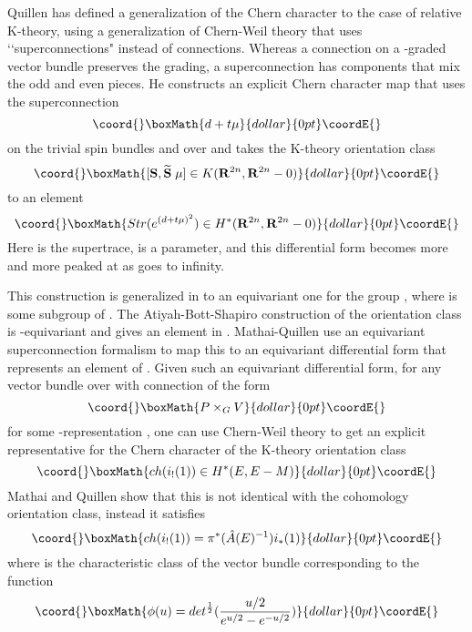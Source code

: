 \documentclass[a4paper,a4paper]{article}
\theoremstyle{conjecture}
\begin{document}
Quillen \cite{Quillen} has defined a generalization of the Chern character to
the case of relative K-theory, using a generalization of Chern-Weil theory that
uses \lq\lq superconnections" instead of connections.  Whereas a connection on
a \coordHE{}-graded vector bundle preserves the grading, a superconnection has
components that mix the odd and even pieces. He constructs an explicit Chern
character map that uses the superconnection
$$\coord{}\boxMath{d+t\mu}{dollar}{0pt}\coordE{}$$ on the trivial spin bundles \coordHE{} and \coordHE{} over \coordHE{}
and takes the K-theory orientation 
class
$$\coord{}\boxMath{[{\mathbf S}, {\mathbf {\widetilde S}}\; \mu]\in K(\mathbf R^{2n}, \mathbf R^{2n}-0)}{dollar}{0pt}\coordE{}$$
to an element 
$$\coord{}\boxMath{ Str( e^{(d+t\mu)^2}) \in H^*(\mathbf R^{2n}, \mathbf R^{2n}-0)}{dollar}{0pt}\coordE{}$$
Here \coordHE{} is the supertrace, \coordHE{} is a parameter, and this differential form becomes more and more
peaked at \coordHE{} as \coordHE{} goes to infinity.

This construction is generalized in \cite{Mathai-Quillen} to an equivariant one for
the group \coordHE{}, where \coordHE{} is some subgroup of \coordHE{}. The Atiyah-Bott-Shapiro
construction of the orientation class is \coordHE{}-equivariant and gives an element in
\coordHE{}. Mathai-Quillen use an equivariant 
superconnection formalism to map this to an equivariant differential form that 
represents an element of \coordHE{}.
Given such an equivariant differential form, for any vector bundle \coordHE{} over \coordHE{} with connection of the form
$$\coord{}\boxMath{P\times_G V}{dollar}{0pt}\coordE{}$$
for some \coordHE{}-representation \coordHE{}, one can use Chern-Weil theory to get an explicit representative
for the Chern character of the K-theory orientation class
$$\coord{}\boxMath{ch(i_!(1))\in H^*(E,E-M)}{dollar}{0pt}\coordE{}$$ 
Mathai and Quillen show that this is not identical with the cohomology orientation class, 
instead it satisfies
$$\coord{}\boxMath{ch(i_!(1))=\pi^*(\hat A(E)^{-1})i_*(1)}{dollar}{0pt}\coordE{}$$
where \coordHE{} is the characteristic class of the vector bundle \coordHE{} corresponding to the function
$$\coord{}\boxMath{\phi(u)=det^{\frac{1}{2}} (\frac{u/2}{e^{u/2}-e^{-u/2}})}{dollar}{0pt}\coordE{}$$ 
\end{document}
